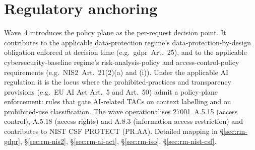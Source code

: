 \section{Regulatory anchoring}
\label{sec:w4-regulatory}

\noindent Wave~4 introduces the policy plane as the per-request
decision point. It contributes to the applicable data-protection
regime's data-protection-by-design obligation enforced at decision
time (e.g.\ \gls{gdpr}~Art.~25), and to the applicable
cybersecurity-baseline regime's risk-analysis-policy and
access-control-policy requirements (e.g.\ NIS2~Art.~21(2)(a) and
(i)). Under the applicable AI regulation it is the locus where the
prohibited-practices and transparency provisions (e.g.\ EU AI Act
Art.~5 and Art.~50) admit a
policy-plane enforcement: rules that gate AI-related
TACs on context labelling and on prohibited-use classification.
The wave operationalises 27001~A.5.15 (access control), A.5.18
(access rights) and A.8.3 (information access restriction) and
contributes to NIST CSF \textsf{PROTECT} (PR.AA). Detailed
mapping in  \S\ref{sec:rm-gdpr},
\S\ref{sec:rm-nis2}, \S\ref{sec:rm-ai-act},
\S\ref{sec:rm-iso}, \S\ref{sec:rm-nist-csf}.
